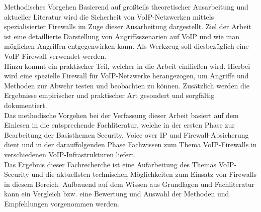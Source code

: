 \begin{section}{Methodisches Vorgehen}
Basierend auf großteils theoretischer Ausarbeitung und aktueller Literatur wird die Sicherheit von VoIP-Netzwerken mittels spezialisierter Firewalls im Zuge dieser Ausarbeitung dargestellt.
Ziel der Arbeit ist eine detaillierte Darstellung von Angriffsszenarien auf VoIP und wie man möglichen Angriffen entgegenwirken kann. Als Werkzeug soll diesbezüglich eine VoIP-Firewall verwendet werden. 
\\
Hinzu kommt ein praktischer Teil, welcher in die Arbeit einfließen wird. Hierbei wird eine spezielle Firewall für VoIP-Netzwerke herangezogen, um Angriffe und Methoden zur Abwehr testen und beobachten zu können. Zusätzlich werden die Ergebnisse empirischer und praktischer Art gesondert und sorgfältig dokumentiert.
\\
Das methodische Vorgehen bei der Verfassung dieser Arbeit basiert auf dem Einlesen in die entsprechende Fachliteratur, welche in der ersten Phase zur Bearbeitung der Basisthemen Security, Voice over IP und Firewall-Absicherung dient und in der darauffolgenden Phase Fachwissen zum Thema VoIP-Firewalls in verschiedenen VoIP-Infrastrukturen liefert.
\\
Das Ergebnis dieser Fachrecherche ist eine Aufarbeitung des Themas VoIP-Security und die aktuellsten technischen Möglichkeiten zum Einsatz von Firewalls in diesem Bereich. 
Aufbauend auf dem Wissen aus Grundlagen und Fachliteratur kann ein Vergleich bzw. eine Bewertung und Auswahl der Methoden und Empfehlungen vorgenommen werden. 
\end{section}
\pagebreak

